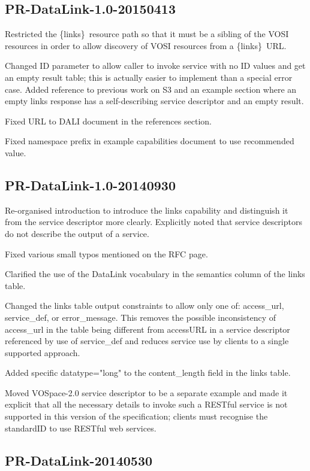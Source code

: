 \documentclass[11pt,a4paper]{ivoa}
\newcommand{\blinks}{\{links\}}
\newcommand{\attval}[2]{#1={\allowbreak}{"}#2{"}}
\begin{document}
\subsection{PR-DataLink-1.0-20150413}

Restricted the \blinks\ resource path so that it must be a sibling of
the VOSI resources in order to allow discovery of VOSI resources from
a \blinks\ URL.

Changed ID parameter to allow caller to invoke service with no ID values
and get an empty result table; this is actually easier to implement
than a special error case. Added reference to previous work on S3 and
an example section where an empty links response has a self-describing
service descriptor and an empty result.

Fixed URL to DALI document in the references section.

Fixed namespace prefix in example capabilities document to use recommended
value.


\subsection{PR-DataLink-1.0-20140930}

Re-organised introduction to introduce the links capability and
distinguish it from the service descriptor more clearly. Explicitly
noted that service descriptors do not describe the output of a service.

Fixed various small typos mentioned on the RFC page.

Clarified the use of the DataLink vocabulary in the semantics column of
the links table.

Changed the links table output constraints to allow only one of:
access\_url, service\_def, or error\_message. This removes the possible
inconsistency of access\_url in the table being different from accessURL
in a service descriptor referenced by use of service\_def and reduces
service use by clients to a single supported approach.

Added specific \attval{datatype}{long} to the content\_length field in the
links table.

Moved VOSpace-2.0 service descriptor to be a separate example and made
it explicit that all the necessary details to invoke such a RESTful
service is not supported in this version of the specification; clients
must recognise the standardID to use RESTful web services.


\subsection{PR-DataLink-20140530}
\end{document}
